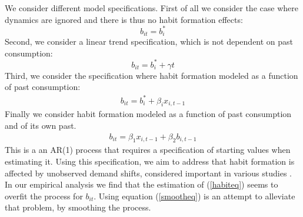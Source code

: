 We consider different model specifications.
First of all we consider the case where dynamics are ignored and there is thus no habit formation effects:
\begin{equation}
    b_{it} = b_i^*
\end{equation}
Second, we consider a linear trend specification, which is not dependent on past consumption:
\begin{equation}
    b_{it} = b_i^* + \gamma t
\end{equation}
Third, we consider the specification where habit formation modeled as a function of past consumption:
\begin{align}\label{habiteq}
    b_{it} = b_i^* + \beta_i x_{i,t-1}
\end{align}
Finally we consider habit formation modeled as a function of past consumption and of its own past.
\begin{align}\label{smootheq}
    b_{it} = \beta_1 x_{i,t-1} + \beta_2 b_{i,t-1}
\end{align}
This is a an AR(1) process that requires a specification of starting values when estimating it. Using this specification, we aim to address that habit formation is affected by unobserved demand shifts, considered important in various studies \citep{demand_shift}. In our empirical analysis we find that the estimation of (\ref{habiteq}) seems to overfit the process for $b_{it}$. Using equation (\ref{smootheq}) is an attempt to alleviate that problem, by smoothing the process. 

